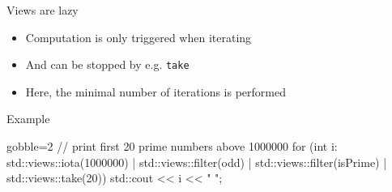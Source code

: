 \begin{frame}[fragile]
  \begin{block}{Views are lazy}
    \begin{itemize}
    \item Computation is only triggered when iterating
    \item And can be stopped by e.g. \texttt{take}
    \item Here, the minimal number of iterations is performed
    \end{itemize}
  \end{block}
  \begin{exampleblock}{Example }
    \begin{cppcode*}{gobble=2}
      // print first 20 prime numbers above 1000000
      for (int i: std::views::iota(1000000)
                  | std::views::filter(odd)
                  | std::views::filter(isPrime)
                  | std::views::take(20)) {
        std::cout << i << " ";
      }
    \end{cppcode*}
  \end{exampleblock}
\end{frame}

